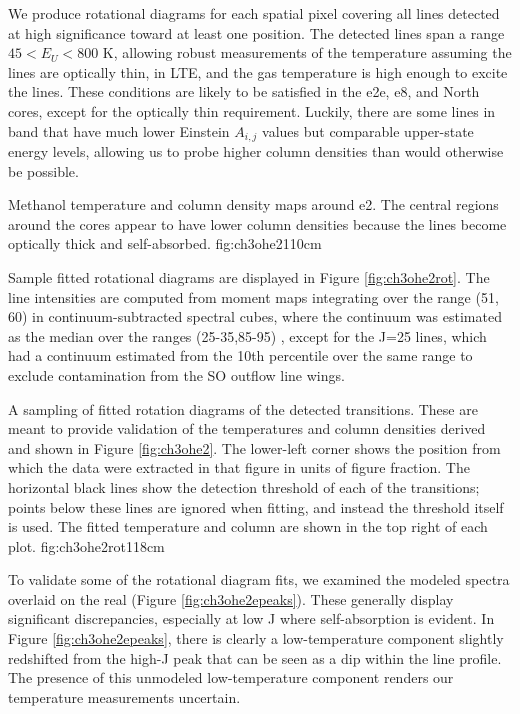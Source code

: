 \documentclass{aa}
\begin{document}
We produce rotational diagrams for each spatial pixel covering all \methanol lines
detected at high significance toward at least one position.  The detected lines
span a range $45 < E_U < 800$ K, allowing robust measurements of the temperature
assuming the lines are optically thin, in LTE, and the gas temperature is high
enough to excite the lines.  These conditions are likely to be satisfied in the
e2e, e8, and North cores, except for the optically thin requirement.  Luckily,
there are some lines in band that have much lower Einstein $A_{i,j}$ values
but comparable upper-state energy levels, allowing us to probe higher column
densities than would otherwise be possible.

{Methanol temperature and column density maps around e2.  The central regions around
the cores appear to have lower column densities because the lines become
optically thick and self-absorbed.}
{fig:ch3ohe2}{1}{10cm}

Sample fitted rotational diagrams are displayed in Figure \ref{fig:ch3ohe2rot}.
The line intensities are computed from moment maps integrating over the range
(51, 60) \kms in continuum-subtracted spectral cubes, where the continuum
was estimated as the median over the ranges (25-35,85-95) \kms, except
for the J=25 lines, which had a continuum estimated from the 10th percentile
over the same range to exclude contamination from the SO outflow line wings.

{A sampling of fitted rotation diagrams of the detected \methanol transitions.
These are meant to provide validation of the temperatures and column densities
derived and shown in Figure \ref{fig:ch3ohe2}.  The lower-left corner shows
the position from which the data were extracted in that figure in units of
figure fraction.  The horizontal black lines show the detection threshold of each
of the transitions; points below these lines are ignored when fitting, and instead
the threshold itself is used.  The fitted temperature and
column are shown in the top right of each plot.
}{fig:ch3ohe2rot}{1}{18cm}

To validate some of the rotational diagram fits, we examined the modeled
spectra overlaid on the real (Figure \ref{fig:ch3ohe2epeaks}).  These generally
display significant discrepancies, especially at low J where self-absorption is
evident.  In Figure \ref{fig:ch3ohe2epeaks}, there is clearly a low-temperature
component slightly redshifted from the high-J peak that can be seen as a dip
within the line profile.  The presence of this unmodeled low-temperature
component renders our \methanol temperature measurements uncertain.
\end{document}
